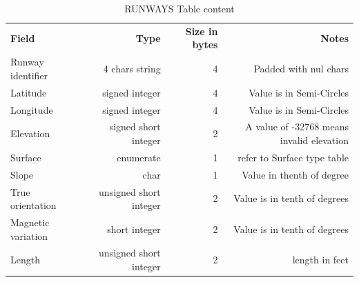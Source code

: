 \documentclass{article}
\newcommand\strpad{Padded with nul chars}
\newcommand\SemiCircle{Value is in Semi-Circles}
\begin{document}
\begin{table}[H]
   \caption{RUNWAYS Table content} 
   \label{tab:RWY}
   \small
   \begin{tabular}{|l|r|r|r|}
   \textbf{Field} & \textbf{Type} & \textbf{Size in bytes} & \textbf{Notes} \\ 
   Runway identifier & 4 chars string & 4 & \strpad \\
   Latitude & signed integer & 4 & \SemiCircle\\
   Longitude & signed integer & 4& \SemiCircle\\
   Elevation & signed short integer & 2 & A value of -32768 means invalid elevation\\
   Surface & enumerate & 1 & refer to Surface type table\\
   Slope & char & 1 &  Value in thenth of degree\\
   True orientation & unsigned short integer & 2 & Value is in tenth of degrees\\
   Magnetic variation & short integer  & 2 & Value is in tenth of degrees\\
   Length & unsigned short integer & 2&length in feet\\
  \end{tabular}
\end{table}
\end{document}
